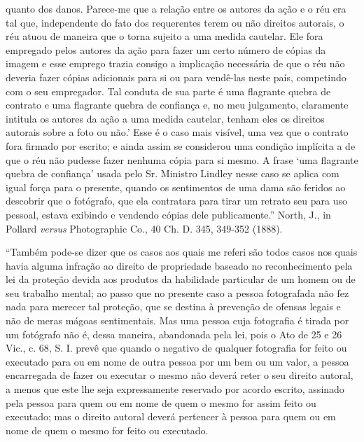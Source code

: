 {  quanto dos danos. Parece-me que a relação entre os autores da ação e o
  réu era tal que, independente do fato dos requerentes terem ou não
  direitos autorais, o réu atuou de maneira que o torna sujeito a uma
  medida cautelar. Ele fora empregado pelos autores da ação para fazer
  um certo número de cópias da imagem e esse emprego trazia consigo a
  implicação necessária de que o réu não deveria fazer cópias adicionais
  para si ou para vendê-las neste país, competindo com o seu empregador.
  Tal conduta de sua parte é uma flagrante quebra de contrato e uma
  flagrante quebra de confiança e, no meu julgamento, claramente
  intitula os autores da ação a uma medida cautelar, tenham eles os
  direitos autorais sobre a foto ou não.' Esse é o caso mais visível,
  uma vez que o contrato fora firmado por escrito; e ainda assim se
  considerou uma condição implícita a de que o réu não pudesse fazer
  nenhuma cópia para si mesmo. A frase `uma flagrante quebra de
  confiança' usada pelo Sr. Ministro Lindley nesse caso se aplica com
  igual força para o presente, quando os sentimentos de uma dama são
  feridos ao descobrir que o fotógrafo, que ela contratara para tirar um
  retrato seu para uso pessoal, estava exibindo e vendendo cópias dele
  publicamente.'' North, J., in Pollard \emph{versus} Photographic Co.,
  40 Ch. D. 345, 349-352 (1888).

  ``Também pode-se dizer que os casos aos quais me referi são todos
  casos nos quais havia alguma infração ao direito de propriedade
  baseado no reconhecimento pela lei da proteção devida aos produtos da
  habilidade particular de um homem ou de seu trabalho mental; ao passo
  que no presente caso a pessoa fotografada não fez nada para merecer
  tal proteção, que se destina à prevenção de ofensas legais e não de
  meras mágoas sentimentais. Mas uma pessoa cuja fotografia é tirada por
  um fotógrafo não é, dessa maneira, abandonada pela lei, pois o Ato de
  25 e 26 Vic., c. 68, S. I. prevê que quando o negativo de qualquer
  fotografia for feito ou executado para ou em nome de outra pessoa por
  um bem ou um valor, a pessoa encarregada de fazer ou executar o mesmo
  não deverá reter o seu direito autoral, a menos que este lhe seja
  expressamente reservado por acordo escrito, assinado pela pessoa para
  quem ou em nome de quem o mesmo for assim feito ou executado; mas o
  direito autoral deverá pertencer à pessoa para quem ou em nome de quem
  o mesmo for feito ou executado.

}

